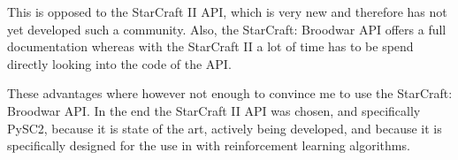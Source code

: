 This is opposed to the StarCraft II API, which is very new and therefore has not yet developed such a community.
Also, the StarCraft: Broodwar API offers a full documentation whereas with the StarCraft II a lot of time has to be spend directly looking into the code of the API.

These advantages where however not enough to convince me to use the StarCraft: Broodwar API.
In the end the StarCraft II API was chosen, and specifically PySC2, because it is state of the art, actively being developed, and because it is specifically designed for the use in with reinforcement learning algorithms.


